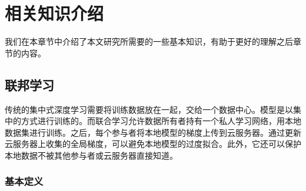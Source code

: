 \chapter{相关知识介绍}
\label{ch2}
我们在本章节中介绍了本文研究所需要的一些基本知识，有助于更好的理解之后章节的内容。


\section{联邦学习}
传统的集中式深度学习需要将训练数据放在一起，交给一个数据中心。模型是以集中的方式进行训练的。而联合学习允许数据所有者持有一个私人学习网络，用本地数据集进行训练。之后，每个参与者将本地模型的梯度上传到云服务器。通过更新云服务器上收集的全局梯度，可以避免本地模型的过度拟合。此外，它还可以保护本地数据不被其他参与者或云服务器直接知道。
\subsection{基本定义}



